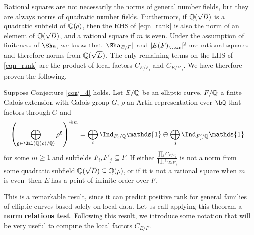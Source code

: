 Rational squares are not necessarily the norms of general number fields, but they are always norms of quadratic number fields. Furthermore, if $\mathbb{Q}(\sqrt{D})$ is a quadratic subfield of $\mathbb{Q}(\rho)$, then the RHS of \eqref{eqn_rank} is also the norm of an element of $\mathbb{Q}(\sqrt{D})$, and a rational square if $m$ is even. Under the assumption of finiteness of $\Sha$, we know that $|\Sha_{E/F}|$ and $|E(F)_{\tors}|^2$ are rational squares and therefore norms from $\mathbb{Q}(\sqrt{D})$. The only remaining terms on the LHS of \eqref{eqn_rank} are the product of local factors $C_{E/F_i}$ and $C_{E/F'_j}$. We have therefore proven the following.

\begin{thm}\cite[Theorem 33]{DEW1} \label{thm_positive_rank}
    Suppose Conjecture \ref{conj_4} holds. Let $E/\mathbb{Q}$ be an elliptic curve, $F/\mathbb{Q}$ a finite Galois extension with Galois group $G$, $\rho$ an Artin representation over $\bQ$ that factors through $G$ and 
    $$\left(\bigoplus_{\mathfrak{g}\in\Gal(\QQ(\rho)/\QQ)}\rho^{\mathfrak{g}}\right)^{\oplus m}=\bigoplus_i\Ind_{F_i/\QQ}\mathds{1}\ominus\bigoplus_j\Ind_{F'_j/\QQ}\mathds{1}$$
    for some $m\geq 1$ and subfields $F_i,F'_j\subseteq F$. If either $\frac{\prod_i C_{E/F_i}}{\prod_j C_{E/F'_j}}$ is not a norm from some quadratic subfield $\mathbb{Q}(\sqrt{D})\subseteq\mathbb{Q}(\rho)$, or if it is not a rational square when $m$ is even, then $E$ has a point of infinite order over $F$.
\end{thm}

This is a remarkable result, since it can predict positive rank for general families of elliptic curves based solely on local data. Let us call applying this theorem a \textbf{norm relations test}.
Following this result, we introduce some notation that will be very useful to compute the local factors $C_{E/F}$.


